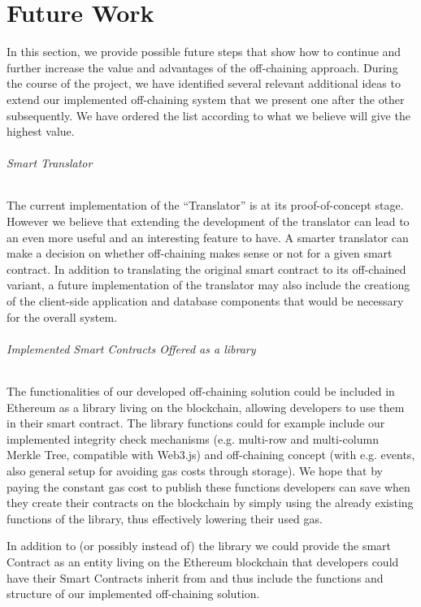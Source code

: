 \chapter{Future Work} \label{sec:future_work}
In this section, we provide possible future steps that show how to continue and further increase the value and advantages of the off-chaining approach. During the course of the project, we have identified several relevant additional ideas to extend our implemented off-chaining system that we present one after the other subsequently. We have ordered the list according to what we believe will give the highest value.

\subparagraph{Smart Translator}
The current implementation of the “Translator” is at its proof-of-concept stage. However we believe that extending the development of the translator can lead to an even more useful and an interesting feature to have. A smarter translator can make a decision on whether off-chaining makes sense or not for a given smart contract. In addition to translating the original smart contract to its off-chained variant, a future implementation of the translator may also include the creationg of the client-side application and database components that would be necessary for the overall system.

\subparagraph{Implemented Smart Contracts Offered as a library}
The functionalities of our developed off-chaining solution could be included in Ethereum as a library living on the blockchain, allowing developers to use them in their smart contract. The library functions could for example include our implemented integrity check mechanisms (e.g. multi-row and multi-column Merkle Tree, compatible with Web3.js) and off-chaining concept (with e.g. events, also general setup for avoiding gas costs through storage). We hope that by paying the constant gas cost to publish these functions developers can save when they create their contracts on the blockchain by simply using the already existing functions of the library, thus effectively lowering their used gas.

In addition to (or possibly instead of) the library we could provide the smart Contract as an entity living on the Ethereum blockchain that developers could have their Smart Contracts inherit from and thus include the functions and structure of our implemented off-chaining solution.

